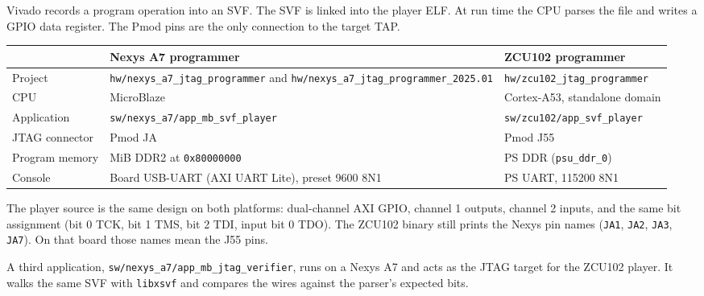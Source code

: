 \documentclass[
  11pt,
  a4paper,
]{article}
\newcounter{none} %
\begin{document}
Vivado records a program operation into an SVF. The SVF is linked into
the player ELF. At run time the CPU parses the file and writes a GPIO
data register. The Pmod pins are the only connection to the target TAP.

{\def\LTcaptype{none} %
\begin{longtable}[]{@{}
  >{\raggedright\arraybackslash}p{}
  >{\raggedright\arraybackslash}p{}
  >{\raggedright\arraybackslash}p{}@{}}
\toprule\noalign{}
\begin{minipage}[b]{\linewidth}\raggedright
\end{minipage} & \begin{minipage}[b]{\linewidth}\raggedright
Nexys A7 programmer
\end{minipage} & \begin{minipage}[b]{\linewidth}\raggedright
ZCU102 programmer
\end{minipage} \\ 
\midrule\noalign{}
\endhead
\bottomrule\noalign{}
\endlastfoot
Project & \texttt{hw/nexys\_a7\_jtag\_programmer} and
\texttt{hw/nexys\_a7\_jtag\_programmer\_2025.01} &
\texttt{hw/zcu102\_jtag\_programmer} \\
CPU & MicroBlaze & Cortex-A53, standalone domain \\
Application & \texttt{sw/nexys\_a7/app\_mb\_svf\_player} &
\texttt{sw/zcu102/app\_svf\_player} \\
JTAG connector & Pmod JA & Pmod J55 \\
Program memory & 128 MiB DDR2 at \texttt{0x80000000} & PS DDR
(\texttt{psu\_ddr\_0}) \\
Console & Board USB-UART (AXI UART Lite), preset 9600 8N1 & PS UART,
115200 8N1 \\
\end{longtable}
}

The player source is the same design on both platforms: dual-channel AXI
GPIO, channel 1 outputs, channel 2 inputs, and the same bit assignment
(bit 0 TCK, bit 1 TMS, bit 2 TDI, input bit 0 TDO). The ZCU102 binary
still prints the Nexys pin names (\texttt{JA1}, \texttt{JA2},
\texttt{JA3}, \texttt{JA7}). On that board those names mean the J55
pins.

A third application, \texttt{sw/nexys\_a7/app\_mb\_jtag\_verifier}, runs
on a Nexys A7 and acts as the JTAG target for the ZCU102 player. It
walks the same SVF with \texttt{libxsvf} and compares the wires against
the parser's expected bits.
\end{document}
